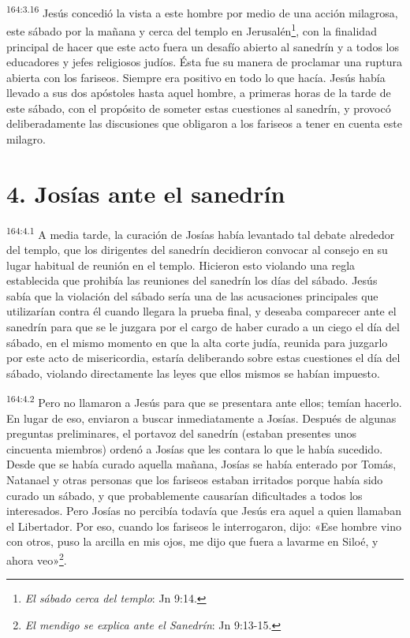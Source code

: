 \par
\textsuperscript{164:3.16} Jesús concedió la vista a este hombre por medio de una acción milagrosa, este sábado por la mañana y cerca del templo en Jerusalén\footnote{\textit{El sábado cerca del templo}: Jn 9:14.}, con la finalidad principal de hacer que este acto fuera un desafío abierto al sanedrín y a todos los educadores y jefes religiosos judíos. Ésta fue su manera de proclamar una ruptura abierta con los fariseos. Siempre era positivo en todo lo que hacía. Jesús había llevado a sus dos apóstoles hasta aquel hombre, a primeras horas de la tarde de este sábado, con el propósito de someter estas cuestiones al sanedrín, y provocó deliberadamente las discusiones que obligaron a los fariseos a tener en cuenta este milagro.

\section*{4. Josías ante el sanedrín}
\par
\textsuperscript{164:4.1} A media tarde, la curación de Josías había levantado tal debate alrededor del templo, que los dirigentes del sanedrín decidieron convocar al consejo en su lugar habitual de reunión en el templo. Hicieron esto violando una regla establecida que prohibía las reuniones del sanedrín los días del sábado. Jesús sabía que la violación del sábado sería una de las acusaciones principales que utilizarían contra él cuando llegara la prueba final, y deseaba comparecer ante el sanedrín para que se le juzgara por el cargo de haber curado a un ciego el día del sábado, en el mismo momento en que la alta corte judía, reunida para juzgarlo por este acto de misericordia, estaría deliberando sobre estas cuestiones el día del sábado, violando directamente las leyes que ellos mismos se habían impuesto.

\par
\textsuperscript{164:4.2} Pero no llamaron a Jesús para que se presentara ante ellos; temían hacerlo. En lugar de eso, enviaron a buscar inmediatamente a Josías. Después de algunas preguntas preliminares, el portavoz del sanedrín (estaban presentes unos cincuenta miembros) ordenó a Josías que les contara lo que le había sucedido. Desde que se había curado aquella mañana, Josías se había enterado por Tomás, Natanael y otras personas que los fariseos estaban irritados porque había sido curado un sábado, y que probablemente causarían dificultades a todos los interesados. Pero Josías no percibía todavía que Jesús era aquel a quien llamaban el Libertador. Por eso, cuando los fariseos le interrogaron, dijo: «Ese hombre vino con otros, puso la arcilla en mis ojos, me dijo que fuera a lavarme en Siloé, y ahora veo»\footnote{\textit{El mendigo se explica ante el Sanedrín}: Jn 9:13-15.}.

